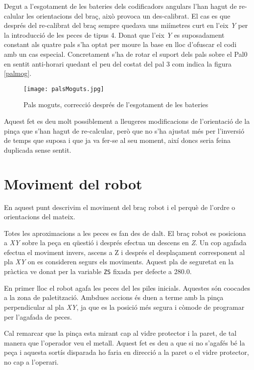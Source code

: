 Degut a l'esgotament de les bateries dels codificadors
angulars l'han hagut de re-calular les orientacions del braç, això provoca un
des-calibrat. El cas es que després del re-calibrat
del braç sempre quedava uns mi\lgem ímetres curt en l'eix \emph{Y}
per la introducció de les peces de tipus 4. Donat que l'eix \emph{Y}
es suposadament constant als quatre pals s'ha optat per moure la base en lloc d'ofuscar
el codi amb un cas especial. Concretament s'ha de rotar el suport dels
pals sobre el Pal0 en sentit anti-horari quedant el peu del costat del pal 3
com indica la figura \ref{palmog}. 

\begin{figure}[H]
\begin{center}\label{fig:palmog}
 \texttt{[image: palsMoguts.jpg]}
\end{center}
  \caption{Pals moguts, correcció després de l'esgotament de les bateries}
\end{figure}

Aquest fet es deu molt possiblement a lleugeres modificacions de l'orientació de la pinça
que s'han hagut de re-calcular, però que no s'ha ajustat més per l'inversió de temps
que suposa i que ja va fer-se al seu moment, així doncs seria feina duplicada sense sentit.

\section{Moviment del robot}
En aquest punt descrivim el moviment del braç robot i el perquè de l'ordre o
orientacions del mateix.

Totes les aproximacions a les peces es fan des de dalt. El braç robot es
posiciona a \emph{XY} sobre la peça en qüestió i després efectua un descens en \emph{Z}. Un
cop agafada efectua el moviment invers, ascens a Z i després el desplaçament
corresponent al pla \emph{XY} on es consideren segurs els moviments. Aquest pla de
seguretat en la pràctica ve donat per la variable \texttt{ZS} fixada per
defecte a 280.0.

En primer lloc el robot agafa les peces del les piles inicials.
Aquestes són co\lgem ocades a la zona de paletització. Ambdues
accions és duen a terme amb la pinça perpendicular al pla \emph{XY},
ja que es la posició més segura i còmode de programar per l'agafada
de peces.

Cal remarcar que la pinça esta mirant cap al vidre protector i la paret,
de tal manera que l'operador veu el metall. Aquest fet es deu a que
si no s'agafés bé la peça i aquesta sortís disparada ho faria en
direcció a la paret o el vidre protector, no cap a l'operari.

